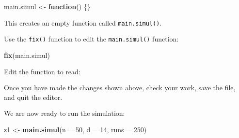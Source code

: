 \documentclass[12pt,a4paper]{book}
\newenvironment{Shaded}{\begin{snugshade}}{\end{snugshade}}
\newcommand{\CharTok}[1]{\textcolor[rgb]{0.31,0.60,0.02}{#1}}
\newcommand{\ControlFlowTok}[1]{\textcolor[rgb]{0.13,0.29,0.53}{\textbf{#1}}}
\newcommand{\DataTypeTok}[1]{\textcolor[rgb]{0.13,0.29,0.53}{#1}}
\newcommand{\DecValTok}[1]{\textcolor[rgb]{0.00,0.00,0.81}{#1}}
\newcommand{\KeywordTok}[1]{\textcolor[rgb]{0.13,0.29,0.53}{\textbf{#1}}}
\newcommand{\NormalTok}[1]{#1}
\newcommand{\OperatorTok}[1]{\textcolor[rgb]{0.81,0.36,0.00}{\textbf{#1}}}
\newcommand{\OtherTok}[1]{\textcolor[rgb]{0.56,0.35,0.01}{#1}}
\newcommand{\StringTok}[1]{\textcolor[rgb]{0.31,0.60,0.02}{#1}}
\theoremstyle{definition}
\theoremstyle{definition}
\theoremstyle{definition}
\theoremstyle{remark}
\begin{document}
\begin{Shaded}
\begin{Highlighting}[]
\NormalTok{main.simul <-}\StringTok{ }\ControlFlowTok{function}\NormalTok{() \{\}}
\end{Highlighting}
\end{Shaded}

This creates an empty function called \texttt{main.simul()}.

Use the \texttt{fix()} function to edit the \texttt{main.simul()}
function:

\begin{Shaded}
\begin{Highlighting}[]
\KeywordTok{fix}\NormalTok{(main.simul)}
\end{Highlighting}
\end{Shaded}

Edit the function to read:

\begin{Shaded}
\end{Shaded}

Once you have made the changes shown above, check your work, save the
file, and quit the editor.

We are now ready to run the simulation:

\begin{Shaded}
\begin{Highlighting}[]
\NormalTok{z1 <-}\StringTok{ }\KeywordTok{main.simul}\NormalTok{(}\DataTypeTok{n =} \DecValTok{50}\NormalTok{, }\DataTypeTok{d =} \DecValTok{14}\NormalTok{, }\DataTypeTok{runs =} \DecValTok{250}\NormalTok{)}
\end{Highlighting}
\end{Shaded}
\end{document}
